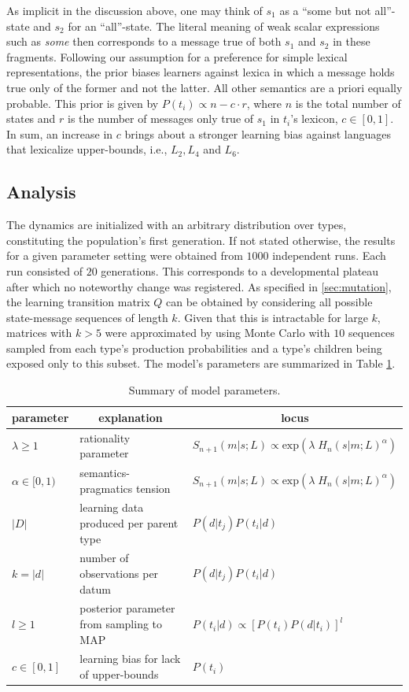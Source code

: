\documentclass[a4paper]{article}
\begin{document}
As implicit in the discussion above, one may think of $s_1$ as a ``some but not all''-state and $s_2$ for an ``all''-state. The literal meaning of weak scalar expressions such as {\em some} then corresponds to a message true of both $s_1$ and $s_2$ in these fragments.  Following our assumption for a preference for simple lexical representations, the prior biases learners against lexica in which a message holds true only of the former and not the latter. All other semantics are a priori equally probable. This prior is given by $P(t_i) \propto n - c \cdot r$, where $n$ is the total number of states and $r$ is the number of messages only true of $s_1$ in $t_i$'s lexicon, $c \in [0,1]$. In sum, an increase in $c$ brings about a stronger learning bias against languages that lexicalize upper-bounds, i.e., $L_2, L_4$ and $L_6$.


\subsection{Analysis}
The dynamics are initialized with an arbitrary distribution over types, constituting the population's first generation. If not stated otherwise, the results for a given parameter setting were obtained from $1000$ independent runs. Each run consisted of $20$ generations. This corresponds to a developmental plateau after which no noteworthy change was registered. As specified in \ref{sec:mutation}, the learning transition matrix $Q$ can be obtained by considering all possible state-message sequences of length $k$. Given that this is intractable for large $k$, matrices with $k > 5$ were approximated by using Monte Carlo with $10$ sequences sampled from each type's production probabilities and a type's children being exposed only to this subset. The model's parameters are summarized in Table \ref{tab:summary}.

\begin{table}
\centering
\begin{tabular}{l|l|l}
    \multicolumn{1}{c}{parameter} & \multicolumn{1}{c}{explanation} & \multicolumn{1}{c}{locus}\\ \hline
    $\lambda \geq 1$ & rationality parameter & $S_{n+1}(m|s;L) \propto \text{exp}(\lambda \; H_{n}(s|m;L)^\alpha)$\\
    $\alpha \in [0,1)$ & semantics-pragmatics tension & $S_{n+1}(m|s;L) \propto \text{exp}(\lambda \; H_{n}(s|m;L)^\alpha)$\\ 
    $|D|$ & learning data produced per parent type & $P(d|t_j)P(t_i|d)$\\
    $k = |d|$ & number of observations per datum& $P(d|t_j)P(t_i|d)$\\
    $l \geq 1$ & posterior parameter from sampling to MAP & $P(t_i|d) \propto [P(t_i)P(d|t_i)]^l$\\
    $c \in [0,1]$ & learning bias for lack of upper-bounds &  $P(t_i)$
\end{tabular}
\caption{Summary of model parameters.} 
\label{tab:summary}
\end{table}
\end{document}
